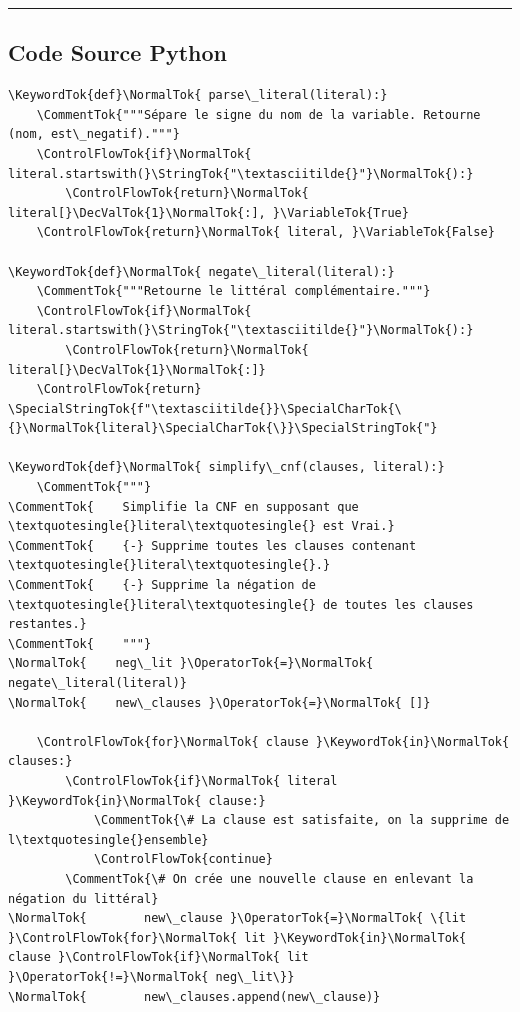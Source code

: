 \documentclass[11pt,a4paper]{article}
\begin{document}
\begin{center}\rule{0.5\linewidth}{0.5pt}\end{center}

\hypertarget{code-source-python}{%
\subsection{Code Source Python}\label{code-source-python}}

\begin{lstlisting}
\KeywordTok{def}\NormalTok{ parse\_literal(literal):}
    \CommentTok{"""Sépare le signe du nom de la variable. Retourne (nom, est\_negatif)."""}
    \ControlFlowTok{if}\NormalTok{ literal.startswith(}\StringTok{"\textasciitilde{}"}\NormalTok{):}
        \ControlFlowTok{return}\NormalTok{ literal[}\DecValTok{1}\NormalTok{:], }\VariableTok{True}
    \ControlFlowTok{return}\NormalTok{ literal, }\VariableTok{False}

\KeywordTok{def}\NormalTok{ negate\_literal(literal):}
    \CommentTok{"""Retourne le littéral complémentaire."""}
    \ControlFlowTok{if}\NormalTok{ literal.startswith(}\StringTok{"\textasciitilde{}"}\NormalTok{):}
        \ControlFlowTok{return}\NormalTok{ literal[}\DecValTok{1}\NormalTok{:]}
    \ControlFlowTok{return} \SpecialStringTok{f"\textasciitilde{}}\SpecialCharTok{\{}\NormalTok{literal}\SpecialCharTok{\}}\SpecialStringTok{"}

\KeywordTok{def}\NormalTok{ simplify\_cnf(clauses, literal):}
    \CommentTok{"""}
\CommentTok{    Simplifie la CNF en supposant que \textquotesingle{}literal\textquotesingle{} est Vrai.}
\CommentTok{    {-} Supprime toutes les clauses contenant \textquotesingle{}literal\textquotesingle{}.}
\CommentTok{    {-} Supprime la négation de \textquotesingle{}literal\textquotesingle{} de toutes les clauses restantes.}
\CommentTok{    """}
\NormalTok{    neg\_lit }\OperatorTok{=}\NormalTok{ negate\_literal(literal)}
\NormalTok{    new\_clauses }\OperatorTok{=}\NormalTok{ []}

    \ControlFlowTok{for}\NormalTok{ clause }\KeywordTok{in}\NormalTok{ clauses:}
        \ControlFlowTok{if}\NormalTok{ literal }\KeywordTok{in}\NormalTok{ clause:}
            \CommentTok{\# La clause est satisfaite, on la supprime de l\textquotesingle{}ensemble}
            \ControlFlowTok{continue}
        \CommentTok{\# On crée une nouvelle clause en enlevant la négation du littéral}
\NormalTok{        new\_clause }\OperatorTok{=}\NormalTok{ \{lit }\ControlFlowTok{for}\NormalTok{ lit }\KeywordTok{in}\NormalTok{ clause }\ControlFlowTok{if}\NormalTok{ lit }\OperatorTok{!=}\NormalTok{ neg\_lit\}}
\NormalTok{        new\_clauses.append(new\_clause)}


\end{lstlisting}
\end{document}
